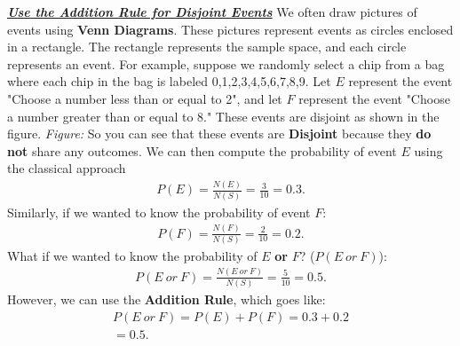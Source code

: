 \documentclass{report}
\begin{document}
    \pagebreak \bigbreak \noindent
    \textbf{\textit{\underline{Use the Addition Rule for Disjoint Events}}}
    \bigbreak \noindent 
    We often draw  pictures of events using \textbf{Venn Diagrams}. These pictures represent events as circles enclosed in a rectangle. The
    rectangle represents the sample space, and each circle represents an event. For example, suppose we randomly select a 
    chip from a bag where each chip in the bag is labeled 0,1,2,3,4,5,6,7,8,9. Let $E $ represent the event "Choose a number less than or equal to 2",
    and let $F $ represent the event "Choose a number greater than or equal to 8." These events are disjoint as shown in the figure.
    \bigbreak \noindent 
    \textit{Figure:}
    \bigbreak \noindent 
    So you can see that these events are \textbf{Disjoint} because they \textbf{do not} share any outcomes.
    \bigbreak \noindent 
    We can then compute the probability of event $E$ using the classical approach
    \begin{align*}
        P(E) = \frac{N(E)}{N(S)} = \frac{3}{10} = 0.3
    .\end{align*}
    \bigbreak \noindent 
    Similarly,  if we wanted to know the probability of event $F$: 
    \begin{align*}
        P(F) = \frac{N(F)}{N(S)} = \frac{2}{10} = 0.2
    .\end{align*}
    \bigbreak \noindent 
    What if we wanted to know the probability of $E$ \textbf{or} $F $? ($P(E\ or\ F)$):
    \begin{align*}
        P(E\ or\ F) = \frac{N(E\ or\ F)}{N(S)} = \frac{5}{10} = 0.5 
    .\end{align*}
    \bigbreak \noindent 
    However, we can use the \textbf{Addition Rule}, which goes like:
    \begin{align*}
     P(E\ or\ F) = P(E) + P(F) = 0.3 + 0.2  \\
     = 0.5
    .\end{align*}
\end{document}
